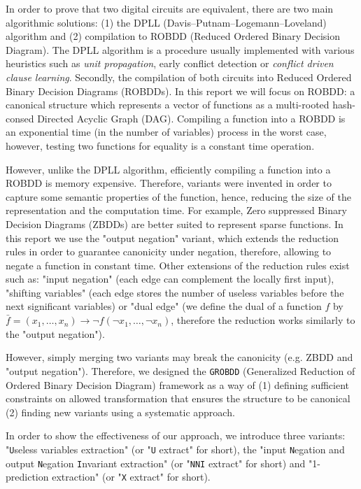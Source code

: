 \documentclass[a4paper,10pt]{article}
\newcommand{\Uextract}{"\texttt{U}seless variables extraction"}
\newcommand{\uextract}{"\texttt{U} extract"}
\newcommand{\NNIextract}{"input \texttt{N}egation and output \texttt{N}egation \texttt{I}nvariant extraction"}
\newcommand{\nniextract}{"\texttt{NNI} extract"}
\newcommand{\Xextract}{"1-prediction extraction"}
\newcommand{\xextract}{"\texttt{X} extract"}
\newcommand{\GroBdd}{\texttt{GROBDD}}
\begin{document}
In order to prove that two digital circuits are equivalent, there are two main algorithmic solutions: (1) the DPLL (Davis–Putnam–Logemann–Loveland) algorithm and (2) compilation to ROBDD (Reduced Ordered Binary Decision Diagram).
The DPLL algorithm is a procedure usually implemented with various heuristics such as \textit{unit propagation}, early conflict detection or \textit{conflict driven clause learning}.
Secondly, the compilation of both circuits into Reduced Ordered Binary Decision Diagrams (ROBDDs).
In this report we will focus on ROBDD: a canonical structure which represents a vector of functions as a multi-rooted hash-consed Directed Acyclic Graph (DAG).
Compiling a function into a ROBDD is an exponential time (in the number of variables) process in the worst case, however, testing two functions for equality is a constant time operation.


However, unlike the DPLL algorithm, efficiently compiling a function into a ROBDD is memory expensive.
Therefore, variants were invented in order to capture some semantic properties of the function, hence, reducing the size of the representation and the computation time.
For example, Zero suppressed Binary Decision Diagrams (ZBDDs) are better suited to represent sparse functions.
In this report we use the "output negation" variant\cite{BryantVariantN}, which extends the reduction rules in order to guarantee canonicity under negation, therefore, allowing to negate a function in constant time.
Other extensions of the reduction rules exist such as: "input negation"\cite{MinatoVariants} (each edge can complement the locally first input), "shifting variables"\cite{MinatoVariants} (each edge stores the number of useless variables before the next significant variables) or "dual edge"\cite{RolfVariantDual} (we define the dual of a function $f$ by $\bar{f} = (x_1, \dots, x_n) \longrightarrow \lnot f(\lnot x_1, \dots, \lnot x_n)$, therefore the reduction works similarly to the "output negation").

However, simply merging two variants may break the canonicity (e.g. ZBDD and "output negation").
Therefore, we designed the \GroBdd{} (Generalized Reduction of Ordered Binary Decision Diagram) framework as a way of (1) defining sufficient constraints on allowed transformation that ensures the structure to be canonical (2) finding new variants using a systematic approach.

In order to show the effectiveness of our approach, we introduce three variants: \Uextract{} (or \uextract{} for short), the \NNIextract{} (or \nniextract{} for short) and \Xextract{} (or \xextract{} for short).
\end{document}
